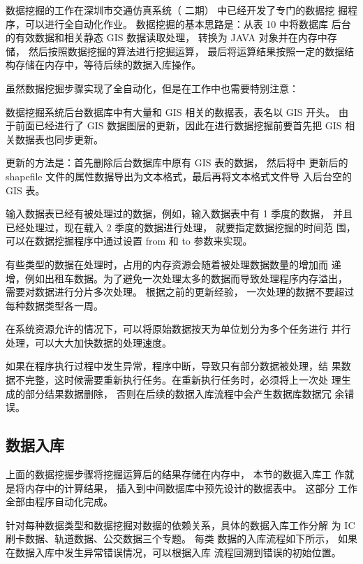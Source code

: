 数据挖掘的工作在深圳市交通仿真系统（ 二期） 中已经开发了专门的数据挖
掘程序，可以进行全自动化作业。 数据挖掘的基本思路是：从表 10 中将数据库
后台的有效数据和相关静态 GIS 数据读取处理， 转换为 JAVA 对象并在内存中存
储， 然后按照数据挖掘的算法进行挖掘运算， 最后将运算结果按照一定的数据结
构存储在内存中，等待后续的数据入库操作。

虽然数据挖掘步骤实现了全自动化，但是在工作中也需要特别注意：

数据挖掘系统后台数据库中有大量和 GIS 相关的数据表，表名以 GIS 开头。
由于前面已经进行了 GIS 数据图层的更新，因此在进行数据挖掘前要首先把 GIS
相关数据表也同步更新。

更新的方法是：首先删除后台数据库中原有 GIS 表的数据， 然后将中
更新后的 shapefile 文件的属性数据导出为文本格式，最后再将文本格式文件导
入后台空的 GIS 表。

输入数据表已经有被处理过的数据，例如，输入数据表中有 1 季度的数据，
并且已经处理过，现在载入 2 季度的数据进行处理， 就要指定数据挖掘的时间范
围， 可以在数据挖掘程序中通过设置 from 和 to 参数来实现。

有些类型的数据在处理时，占用的内存资源会随着被处理数据数量的增加而
递增，例如出租车数据。为了避免一次处理太多的数据而导致处理程序内存溢出，
需要对数据进行分片多次处理。 根据之前的更新经验， 一次处理的数据不要超过
每种数据类型各一周。

在系统资源允许的情况下，可以将原始数据按天为单位划分为多个任务进行
并行处理，可以大大加快数据的处理速度。

如果在程序执行过程中发生异常，程序中断，导致只有部分数据被处理，结
果数据不完整，这时候需要重新执行任务。在重新执行任务时，必须将上一次处
理生成的部分结果数据删除， 否则在后续的数据入库流程中会产生数据库数据冗
余错误。

\subsection{数据入库}
上面的数据挖掘步骤将挖掘运算后的结果存储在内存中， 本节的数据入库工
作就是将内存中的计算结果， 插入到中间数据库中预先设计的数据表中。 这部分
工作全部由程序自动化完成。

针对每种数据类型和数据挖掘对数据的依赖关系，具体的数据入库工作分解
为 IC 刷卡数据、轨道数据、公交数据三个专题。 每类
数据的入库流程如下所示， 如果在数据入库中发生异常错误情况，可以根据入库
流程回溯到错误的初始位置。

